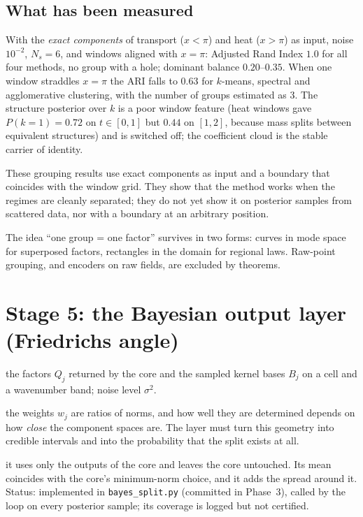 \documentclass[11pt,a4paper]{article}
\theoremstyle{definition}
\newcommand{\sectionbrief}[3]{\begin{leadin}\begin{description}[nosep,leftmargin=3.0cm,labelwidth=2.8cm]
  \item[Starting from] #1
  \item[Why this section] #2
  \item[Role in the paper] #3
  \end{description}\end{leadin}}
\begin{document}
\subsection{What has been measured}
With the \emph{exact components} of transport ($x<\pi$) and heat ($x>\pi$) as input, noise $10^{-2}$, $N_s=6$, and windows aligned with $x=\pi$: Adjusted Rand Index $1.0$ for all four methods, no group with a hole; dominant balance $0.20$--$0.35$. When one window straddles $x=\pi$ the ARI falls to $0.63$ for $k$-means, spectral and agglomerative clustering, with the number of groups estimated as $3$. The structure posterior over $k$ is a poor window feature (heat windows gave $P(k=1)=0.72$ on $t\in[0,1]$ but $0.44$ on $[1,2]$, because mass splits between equivalent structures) and is switched off; the coefficient cloud is the stable carrier of identity.

\begin{caution}[title=What this does not show]
These grouping results use exact components as input and a boundary that coincides with the window grid. They show that the method works when the regimes are cleanly separated; they do not yet show it on posterior samples from scattered data, nor with a boundary at an arbitrary position.
\end{caution}

\begin{takeaway}
The idea ``one group = one factor'' survives in two forms: curves in mode space for superposed factors, rectangles in the domain for regional laws. Raw-point grouping, and encoders on raw fields, are excluded by theorems.
\end{takeaway}



\section{Stage 5: the Bayesian output layer (Friedrichs angle)}\label{sec:bayes}
\sectionbrief
{the factors $Q_j$ returned by the core and the sampled kernel bases $B_j$ on a cell and a wavenumber band; noise level $\sigma^2$.}
{the weights $w_j$ are ratios of norms, and how well they are determined depends on how \emph{close} the component spaces are. The layer must turn this geometry into credible intervals and into the probability that the split exists at all.}
{it uses only the outputs of the core and leaves the core untouched. Its mean coincides with the core's minimum-norm choice, and it adds the spread around it. Status: implemented in \texttt{bayes\_split.py} (committed in Phase~3), called by the loop on every posterior sample; its coverage is logged but not certified.}
\end{document}
